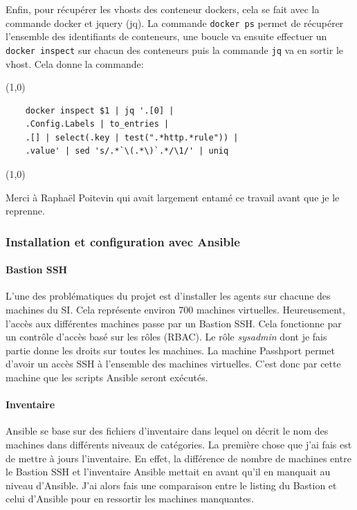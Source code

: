 \documentclass[12pt]{article}
\begin{document}
Enfin, pour récupérer les vhosts des conteneur dockers, cela se fait avec la commande docker et jquery (jq).
La commande \verb|docker ps| permet de récupérer l'ensemble des identifiants de conteneurs, une boucle va ensuite effectuer un \verb|docker inspect| sur chacun des conteneurs puis la commande \verb|jq| va en sortir le vhost.
Cela donne la commande:

\begin{hilite}
\line(1,0){\textwidth}
    \begin{verbatim}
    docker inspect $1 | jq '.[0] |
    .Config.Labels | to_entries |
    .[] | select(.key | test(".*http.*rule")) |
    .value' | sed 's/.*`\(.*\)`.*/\1/' | uniq
    \end{verbatim}
\line(1,0){\textwidth}
\end{hilite}


Merci à Raphaël Poitevin qui avait largement entamé ce travail avant que je le reprenne.

\subsubsection{Installation et configuration avec Ansible}
\paragraph{Bastion SSH}
L'une des problématiques du projet est d'installer les agents sur chacune des machines du SI. 
Cela représente environ 700 machines virtuelles. 
Heureusement, l'accès aux différentes machines passe par un Bastion SSH. 
Cela fonctionne par un contrôle d'accès basé sur les rôles (RBAC). 
Le rôle \textit{sysadmin} dont je fais partie donne les droits sur toutes les machines. 
La machine Passhport permet d'avoir un accès SSH à l'ensemble des machines virtuelles.
C'est donc par cette machine que les scripts Ansible seront exécutés.

\paragraph{Inventaire}
Ansible se base sur des fichiers d'inventaire dans lequel on décrit le nom des machines dans différents niveaux de catégories. 
La première chose que j'ai fais est de mettre à jours l'inventaire. 
En effet, la différence de nombre de machines entre le Bastion SSH et l'inventaire Ansible mettait en avant qu'il en manquait au niveau d'Ansible. 
J'ai alors fais une comparaison entre le listing du Bastion et celui d'Ansible pour en ressortir les machines manquantes.
\end{document}
